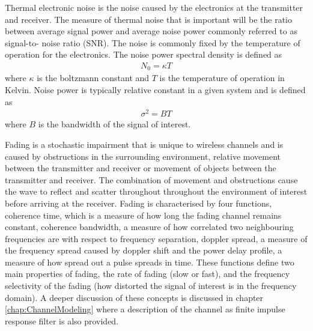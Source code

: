 Thermal electronic noise is the noise %
caused by the electronics at the %
transmitter and receiver. The measure %
of thermal noise that is important %
will be the ratio between average %
signal power and average noise power %
commonly referred to as signal-to-%
noise ratio (SNR). The noise is %
commonly fixed by the temperature %
of operation for the electronics. %
The noise power spectral density %
is defined as %
\begin{align}
	N_{0} = \kappa T
\end{align}
where $\kappa$ is the boltzmann %
constant and $T$ is the temperature %
of operation in Kelvin. Noise %
power is typically relative constant %
in a given system and is defined as
\begin{align}
	\sigma^{2} = BT
\end{align}
where $B$ is the bandwidth of the %
signal of interest.

Fading is a stochastic impairment %
that is unique to wireless %
channels and is caused by obstructions %
in the surrounding environment, %
relative movement between the %
transmitter and receiver %
or movement of objects between %
the transmitter and receiver. The %
combination of movement and %
obstructions cause the wave to %
reflect and scatter throughout %
throughout the environment of %
interest before arriving %
at the receiver. Fading is %
characterised by four functions, %
coherence time, which is a measure %
of how long the fading channel %
remains constant, coherence bandwidth, %
a measure of how correlated two neighbouring %
frequencies are with respect to frequency %
separation, doppler spread, a measure of %
the frequency spread caused by doppler shift %
and the power delay profile, a measure of %
how spread out a pulse spreads in time. %
These functions define two main properties %
of fading, the rate of fading (slow or fast), %
and the frequency selectivity of the fading %
(how distorted the signal of interest is %
in the frequency domain). A deeper discussion %
of these concepts is discussed in chapter %
\ref{chap:ChannelModeling} where a description %
of the channel as finite impulse response filter %
is also provided.

